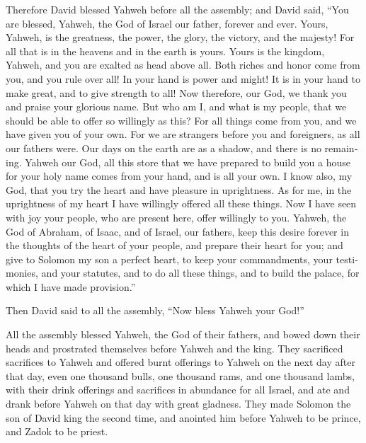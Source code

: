 \begin{paracol}{2}
\begin{otherlanguage}{english}
 Therefore David blessed Yahweh before all the assembly;
and David said, ``You are blessed, Yahweh, the God of Israel our father,
forever and ever.  Yours, Yahweh, is the greatness, the
power, the glory, the victory, and the majesty! For all that is in the
heavens and in the earth is yours. Yours is the kingdom, Yahweh, and you
are exalted as head above all.  Both riches and honor
come from you, and you rule over all! In your hand is power and might!
It is in your hand to make great, and to give strength to all!
 Now therefore, our God, we thank you and praise your
glorious name.  But who am I, and what is my people, that
we should be able to offer so willingly as this? For all things come
from you, and we have given you of your own.  For we are
strangers before you and foreigners, as all our fathers were. Our days
on the earth are as a shadow, and there is no remaining. 
Yahweh our God, all this store that we have prepared to build you a
house for your holy name comes from your hand, and is all your own.
 I know also, my God, that you try the heart and have
pleasure in uprightness. As for me, in the uprightness of my heart I
have willingly offered all these things. Now I have seen with joy your
people, who are present here, offer willingly to you. 
Yahweh, the God of Abraham, of Isaac, and of Israel, our fathers, keep
this desire forever in the thoughts of the heart of your people, and
prepare their heart for you;  and give to Solomon my son
a perfect heart, to keep your commandments, your testimonies, and your
statutes, and to do all these things, and to build the palace, for which
I have made provision.''

 Then David said to all the assembly, ``Now bless Yahweh
your God!''

All the assembly blessed Yahweh, the God of their fathers, and bowed
down their heads and prostrated themselves before Yahweh and the king.
 They sacrificed sacrifices to Yahweh and offered burnt
offerings to Yahweh on the next day after that day, even one thousand
bulls, one thousand rams, and one thousand lambs, with their drink
offerings and sacrifices in abundance for all Israel, 
and ate and drank before Yahweh on that day with great gladness. They
made Solomon the son of David king the second time, and anointed him
before Yahweh to be prince, and Zadok to be priest.


\end{otherlanguage}
\end{paracol}
